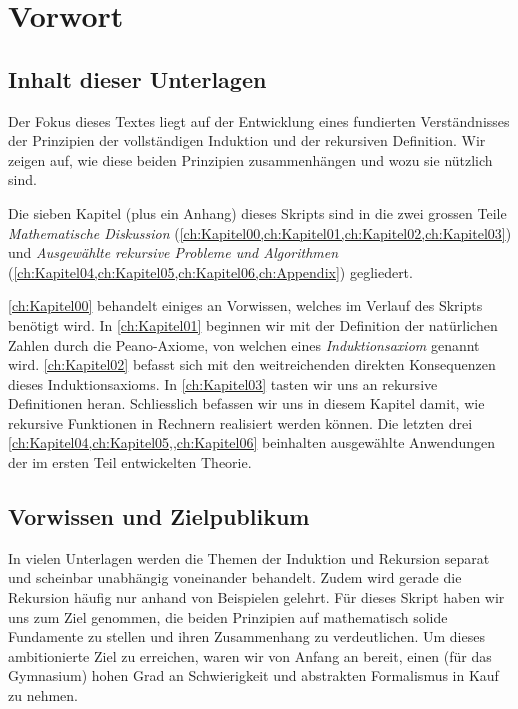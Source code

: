 \chapter{Vorwort}
 
\section*{Inhalt dieser Unterlagen}
Der Fokus dieses Textes liegt auf der Entwicklung eines fundierten Verständnisses der Prinzipien der vollständigen Induktion und der rekursiven Definition. Wir zeigen auf, wie diese beiden Prinzipien zusammenhängen und wozu sie nützlich sind.

Die sieben Kapitel (plus ein Anhang) dieses Skripts sind in die zwei grossen Teile \textit{Mathematische Diskussion} (\cref{ch:Kapitel00,ch:Kapitel01,ch:Kapitel02,ch:Kapitel03}) und \textit{Ausgewählte rekursive Probleme und Algorithmen} (\cref{ch:Kapitel04,ch:Kapitel05,ch:Kapitel06,ch:Appendix}) gegliedert.

\cref{ch:Kapitel00} behandelt einiges an Vorwissen, welches im Verlauf des Skripts benötigt wird. In \cref{ch:Kapitel01} beginnen wir mit der Definition der natürlichen Zahlen durch die Peano-Axiome, von welchen eines \textit{Induktionsaxiom} genannt wird. \cref{ch:Kapitel02} befasst sich mit den weitreichenden direkten Konsequenzen dieses Induktionsaxioms. In \cref{ch:Kapitel03} tasten wir uns an rekursive Definitionen heran. Schliesslich befassen wir uns in diesem Kapitel damit, wie rekursive Funktionen in Rechnern realisiert werden können. Die letzten drei \cref{ch:Kapitel04,ch:Kapitel05,,ch:Kapitel06} beinhalten ausgewählte Anwendungen der im ersten Teil entwickelten Theorie.

\section*{Vorwissen und Zielpublikum}
In vielen Unterlagen werden die Themen der Induktion und Rekursion separat und scheinbar unabhängig voneinander behandelt. Zudem wird gerade die Rekursion häufig nur anhand von Beispielen gelehrt. Für dieses Skript haben wir uns zum Ziel genommen, die beiden Prinzipien auf mathematisch solide Fundamente zu stellen und ihren Zusammenhang zu verdeutlichen. Um dieses ambitionierte Ziel zu erreichen, waren wir von Anfang an bereit, einen (für das Gymnasium) hohen Grad an Schwierigkeit und abstrakten Formalismus in Kauf zu nehmen.

